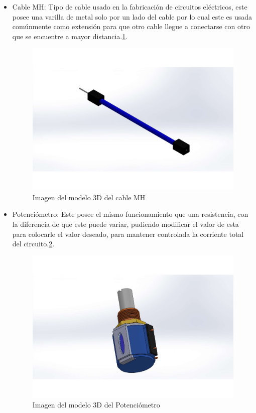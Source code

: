 \begin{itemize}
    \item Cable MH: Tipo de cable usado en la fabricación de circuitos eléctricos, este posee una varilla de metal solo por un lado del cable por lo cual este es usada comúnmente como extensión para que otro cable llegue a conectarse con otro que se encuentre a mayor distancia.\ref{fig:cableMH}.
    
            \begin{figure}[H]
        \centering
        \includegraphics[trim = {65mm 30mm 60mm 40mm},clip,scale=0.5]{19/Img/cableMHFigura.pdf}
        \caption{Imagen del modelo 3D del cable MH}
        \label{fig:cableMH}
    \end{figure}
    
    \item Potenciómetro: Este posee el mismo funcionamiento que una resistencia, con la diferencia de que este puede variar, pudiendo modificar el valor de esta para colocarle el valor deseado, para mantener controlada la corriente total del circuito.\ref{fig:Potenciómetro}.
    
            \begin{figure}[H]
        \centering
        \includegraphics[trim = {65mm 30mm 60mm 40mm},clip,scale=0.5]{19/Img/potenciometroFigura.pdf}
        \caption{Imagen del modelo 3D del Potenciómetro}
        \label{fig:Potenciómetro}
    \end{figure}
        

\end{itemize}
